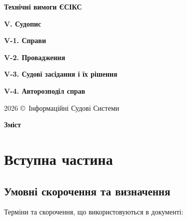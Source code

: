 \documentclass{article}
\newcommand\HUGE[1]{\fontsize{40}{40}\selectfont #1}
\begin{document}
\pagestyle{fancy}

\begin{titlepage}
  \AddToShipoutPictureBG*{\AtPageLowerLeft{\color{nato}\rule{\paperwidth}{\paperheight}}}
  \color{white}\thispagestyle{empty}\vspace*{4cm}\centering
  {\Huge  \textbf{Технічні вимоги ЄСІКС} \par} \vspace{2cm}
  {\HUGE  \textbf{V. Судопис} \par} \vspace{2.5cm}
  {\LARGE \textbf{V-1. Справи} \par}
  {\LARGE \textbf{V-2. Провадження} \par}
  {\LARGE \textbf{V-3. Судові засідання і їх рішення} \par}
  {\LARGE \textbf{V-4. Авторозподіл справ} \par} \vspace{2.5cm}
  \vfill
  {\large 2026 \copyright\ Інформаційні Судові Системи \par}
\end{titlepage}

\newpage

\begin{center}
  {\Huge\color{nato}\bfseries Зміст\par}
\end{center}
\vspace{40pt}
\tableofcontents

\begin{abstract}
ТЕХНІЧНІ ВИМОГИ
НА СТВОРЕННЯ ЗАСОБУ ІНФОРМАТИЗАЦІЇ - КОМПОНЕНТІВ “СУДОПИСУ” ЄДИНОЇ СУДОВОЇ ІНФОРМАЦІЙНО-КОМУНІКАЦІЙНОЇ СИСТЕМИ.
\end{abstract}

\newpage
\section*{Вступна частина}

\subsection*{Умовні скорочення та визначення}

Терміни та скорочення, що використовуються в документі:
\end{document}
